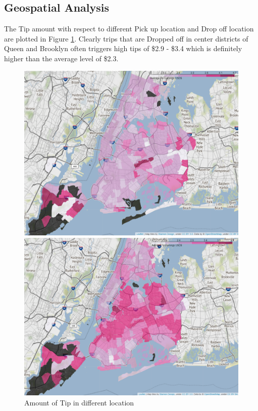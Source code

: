 \documentclass[11pt]{article}
\begin{document}
\subsection{Geospatial Analysis}
The Tip amount with respect to different Pick up location and Drop off location are plotted in Figure \ref{fig:4}. Clearly trips that are Dropped off in center districts of Queen and Brooklyn often triggers high tips of \$2.9 - \$3.4 which is definitely higher than the average level of \$2.3.
\begin{figure}[h!]
   \begin{minipage}{0.5\textwidth}
     \centering
     \includegraphics[width=0.8\linewidth]{PUmap.png}
   \end{minipage}\hfill
   \begin{minipage}{0.5\textwidth}
     \centering
     \includegraphics[width=0.8\linewidth]{DOmap.png}
   \end{minipage}
   \caption{Amount of Tip in different location}
   \label{fig:4}
\end{figure}
\end{document}
